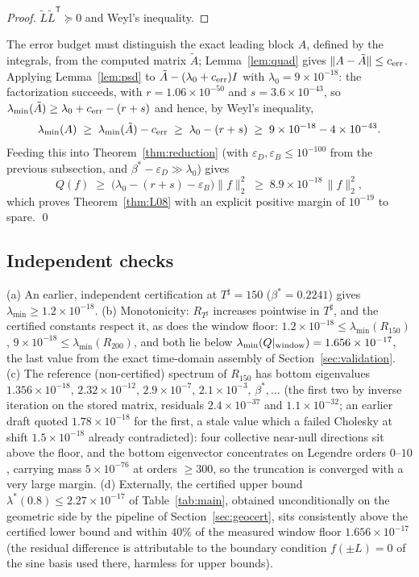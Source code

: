 ﻿\documentclass[11pt]{article}
\newcommand{\lmin}{\lambda^{*}}
\newcommand{\lammin}{\lambda_{\min}}
\newcommand{\Tsharp}{T^{\sharp}}
\begin{document}
\begin{proof}
$\tilde L\tilde L^{\mathsf T}\succeq0$ and Weyl's inequality.
\end{proof}

The error budget must distinguish the exact leading block $A$, defined
by the integrals, from the computed matrix $\tilde A$;
Lemma~\ref{lem:quad} gives $\|A-\tilde A\|\le c_{\rm err}$.  Applying
Lemma~\ref{lem:psd} to $\tilde A-(\lambda_0+c_{\rm err})I$ with
$\lambda_0=9\times10^{-18}$: the factorization succeeds, with
$r=1.06\times10^{-50}$ and $s=3.6\times10^{-43}$, so
$\lammin(\tilde A)\ge\lambda_0+c_{\rm err}-(r+s)$ and hence, by
Weyl's inequality,
\[
\lammin(A)\;\ge\;\lammin(\tilde A)-c_{\rm err}
\;\ge\;\lambda_0-(r+s)
\;\ge\;9\times10^{-18}-4\times10^{-43}.
\]
Feeding this into Theorem~\ref{thm:reduction} (with
$\varepsilon_D,\varepsilon_B\le10^{-100}$ from the previous
subsection, and $\beta^*-\varepsilon_D\gg\lambda_0$) gives
\[
Q(f)\;\ge\;\bigl(\lambda_0-(r+s)-\varepsilon_B\bigr)\|f\|_2^2
\;\ge\;8.9\times10^{-18}\,\|f\|_2^2 ,
\]
which proves Theorem~\ref{thm:L08} with an explicit positive margin
of $10^{-19}$ to spare. \qed

\subsection{Independent checks}
(a) An earlier, independent certification at $\Tsharp=150$
($\beta^*=0.2241$) gives $\lammin\ge1.2\times10^{-18}$.
(b) Monotonicity: $R_{\Tsharp}$ increases pointwise in $\Tsharp$, and
the certified constants respect it, as does the window floor:
$1.2\times10^{-18}\le\lammin(R_{150})$,
$9\times10^{-18}\le\lammin(R_{200})$, and both lie below
$\lammin(Q|_{\rm window})=1.656\times10^{-17}$, the last value from
the exact time-domain assembly of Section~\ref{sec:validation}.
(c) The reference (non-certified) spectrum of $R_{150}$ has bottom
eigenvalues $1.356\times10^{-18},\,2.32\times10^{-12},\,
2.9\times10^{-7},\,2.1\times10^{-3},\,\beta^*,\dots$ (the first two by
inverse iteration on the stored matrix, residuals $2.4\times10^{-37}$
and $1.1\times10^{-32}$; an earlier draft quoted $1.78\times10^{-18}$
for the first, a stale value which a failed Cholesky at shift
$1.5\times10^{-18}$ already contradicted): four collective
near-null directions sit above the floor, and the bottom eigenvector
concentrates on Legendre orders $0$--$10$, carrying mass
$5\times10^{-76}$ at orders $\ge300$, so the truncation is converged
with a very large margin.
(d) Externally, the certified upper bound
$\lmin(0.8)\le2.27\times10^{-17}$ of Table~\ref{tab:main}, obtained
unconditionally on the geometric side by the pipeline of
Section~\ref{sec:geocert}, sits consistently above the certified
lower bound and within $40\%$ of the measured window floor
$1.656\times10^{-17}$ (the residual difference is attributable to the
boundary condition $f(\pm L)=0$ of the sine basis used there, harmless
for upper bounds).
\end{document}
